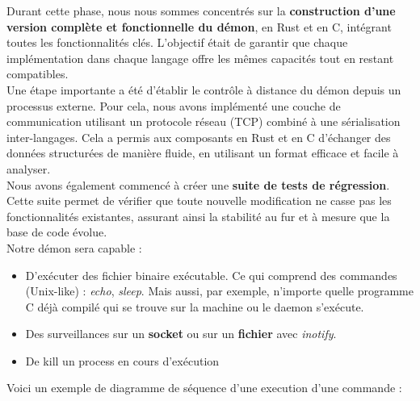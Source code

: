 \documentclass{article}
\begin{document}

Durant cette phase, nous nous sommes concentrés sur la \textbf{construction d’une version complète et fonctionnelle du démon}, en Rust et en C, intégrant toutes les fonctionnalités clés. L’objectif était de garantir que chaque implémentation dans chaque langage offre les mêmes capacités tout en restant compatibles.\\

Une étape importante a été d’établir le contrôle à distance du démon depuis un processus externe. Pour cela, nous avons implémenté une couche de communication utilisant un protocole réseau (TCP) combiné à une sérialisation inter-langages. Cela a permis aux composants en Rust et en C d’échanger des données structurées de manière fluide, en utilisant un format efficace et facile à analyser.\\

Nous avons également commencé à créer une \textbf{suite de tests de régression}. Cette suite permet de vérifier que toute nouvelle modification ne casse pas les fonctionnalités existantes, assurant ainsi la stabilité au fur et à mesure que la base de code évolue.\\

Notre démon sera capable : 
\begin{itemize}
    \item D'exécuter des fichier binaire exécutable. Ce qui comprend des commandes (Unix-like) : \textit{echo}, \textit{sleep}. Mais aussi, par exemple, n'importe quelle programme C déjà compilé qui se trouve sur la machine ou le daemon s'exécute.
    \item Des surveillances sur un \textbf{socket} ou sur un \textbf{fichier} avec \textit{inotify}.
    \item De kill un process en cours d'exécution
\end{itemize}

Voici un exemple de diagramme de séquence d'une execution d'une commande :
\end{document}
